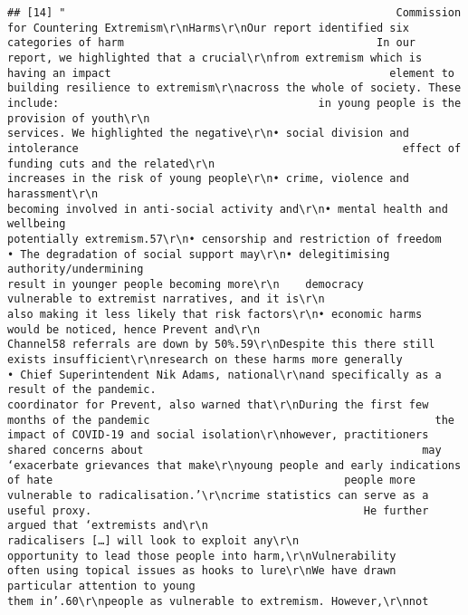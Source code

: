 \documentclass[
]{book}
\begin{document}
\begin{verbatim}
## [14] "                                                   Commission for Countering Extremism\r\nHarms\r\nOur report identified six categories of harm                                       In our report, we highlighted that a crucial\r\nfrom extremism which is having an impact                                           element to building resilience to extremism\r\nacross the whole of society. These include:                                        in young people is the provision of youth\r\n                                                                                   services. We highlighted the negative\r\n• social division and intolerance                                                  effect of funding cuts and the related\r\n                                                                                   increases in the risk of young people\r\n• crime, violence and harassment\r\n                                                                                   becoming involved in anti-social activity and\r\n• mental health and wellbeing                                                      potentially extremism.57\r\n• censorship and restriction of freedom                                            • The degradation of social support may\r\n• delegitimising authority/undermining                                                 result in younger people becoming more\r\n    democracy                                                                          vulnerable to extremist narratives, and it is\r\n                                                                                       also making it less likely that risk factors\r\n• economic harms                                                                       would be noticed, hence Prevent and\r\n                                                                                       Channel58 referrals are down by 50%.59\r\nDespite this there still exists insufficient\r\nresearch on these harms more generally                                             • Chief Superintendent Nik Adams, national\r\nand specifically as a result of the pandemic.                                          coordinator for Prevent, also warned that\r\nDuring the first few months of the pandemic                                            the impact of COVID-19 and social isolation\r\nhowever, practitioners shared concerns about                                           may ‘exacerbate grievances that make\r\nyoung people and early indications of hate                                             people more vulnerable to radicalisation.’\r\ncrime statistics can serve as a useful proxy.                                          He further argued that ‘extremists and\r\n                                                                                       radicalisers […] will look to exploit any\r\n                                                                                       opportunity to lead those people into harm,\r\nVulnerability                                                                          often using topical issues as hooks to lure\r\nWe have drawn particular attention to young                                            them in’.60\r\npeople as vulnerable to extremism. However,\r\nnot 
\end{verbatim}
\end{document}

